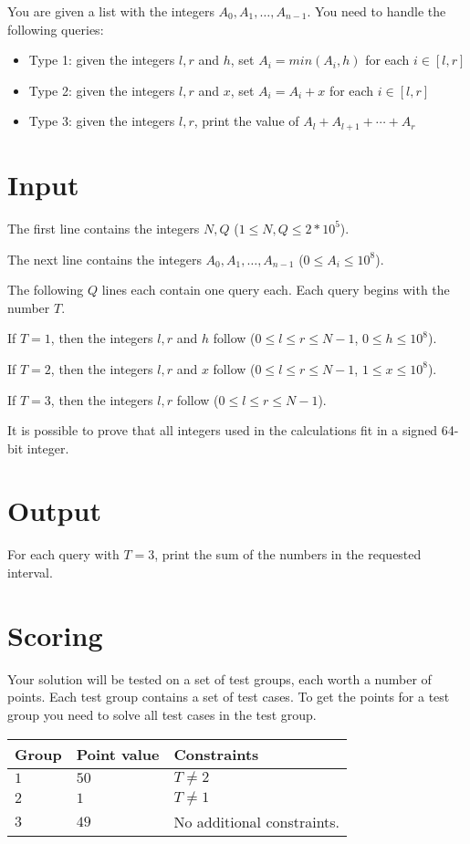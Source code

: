 
You are given a list with the integers $A_0, A_1, \dots, A_{n-1}$. You need to handle the following queries:


\begin{itemize}
    \item Type 1: given the integers $l, r$ and $h$, set $A_i=min(A_i, h)$ for each $i \in [l,r]$
    \item Type 2: given the integers $l, r$ and $x$, set $A_i=A_i+x$ for each $i \in [l,r]$
    \item Type 3: given the integers $l, r$, print the value of $A_l+A_{l+1}+\cdots+A_{r}$
\end{itemize}


\section*{Input}
The first line contains the integers $N, Q$ ($1 \leq N, Q \leq 2*10^5$).

The next line contains the integers $A_0, A_1, \dots, A_{n-1}$ ($0 \leq A_i \leq 10^8$).

The following $Q$ lines each contain one query each. Each query begins with the number $T$.

If $T=1$, then the integers $l, r$ and $h$ follow ($0 \leq l \leq r \leq N - 1$, $0 \leq h \leq 10^8$).

If $T=2$, then the integers $l, r$ and $x$ follow ($0 \leq l \leq r \leq N - 1$, $1 \leq x \leq 10^8$).

If $T=3$, then the integers $l, r$ follow ($0 \leq l \leq r \leq N - 1$).

It is possible to prove that all integers used in the calculations fit in a signed 64-bit integer.

\section*{Output}
For each query with $T=3$, print the sum of the numbers in the requested interval.

\section*{Scoring}
Your solution will be tested on a set of test groups, each worth a number of points.
Each test group contains a set of test cases.
To get the points for a test group you need to solve all test cases in the test group.

\noindent
\begin{tabular}{| l | l | p{12cm} |}
  \hline
  \textbf{Group} & \textbf{Point value} & \textbf{Constraints} \\ \hline
  $1$    & $50$         & $T \neq 2$  \\ \hline
  $2$    & $1$          & $T \neq 1$ \\ \hline
  $3$    & $49$         & No additional constraints. \\ \hline
\end{tabular}
